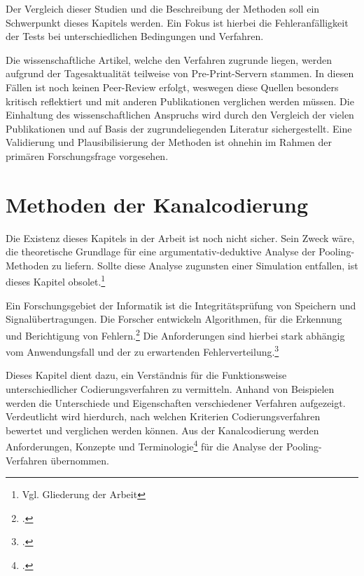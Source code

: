 Der Vergleich dieser Studien und die Beschreibung der Methoden soll ein Schwerpunkt dieses Kapitels werden.
Ein Fokus ist hierbei die Fehleranfälligkeit der Tests bei unterschiedlichen Bedingungen und Verfahren.

Die wissenschaftliche Artikel, welche den Verfahren zugrunde liegen, werden aufgrund der Tagesaktualität teilweise von Pre-Print-Servern stammen.
In diesen Fällen ist noch keinen Peer-Review erfolgt, weswegen diese Quellen besonders kritisch reflektiert und mit anderen Publikationen verglichen werden müssen.
Die Einhaltung des wissenschaftlichen Anspruchs wird durch den Vergleich der vielen Publikationen und auf Basis der zugrundeliegenden Literatur sichergestellt.
Eine Validierung und Plausibilisierung der Methoden ist ohnehin im Rahmen der primären Forschungsfrage vorgesehen.

\section{Methoden der Kanalcodierung}
Die Existenz dieses Kapitels in der Arbeit ist noch nicht sicher.
Sein Zweck wäre, die theoretische Grundlage für eine argumentativ-deduktive Analyse der Pooling-Methoden zu liefern.
Sollte diese Analyse zugunsten einer Simulation entfallen, ist dieses Kapitel obsolet.\footnote{Vgl. Gliederung der Arbeit}

Ein Forschungsgebiet der Informatik ist die Integritätsprüfung von Speichern und Signalübertragungen.
Die Forscher entwickeln Algorithmen, für die Erkennung und Berichtigung von Fehlern.\footcite{hamming_information_1987}
Die Anforderungen sind hierbei stark abhängig vom Anwendungsfall und der zu erwartenden Fehlerverteilung.\footcite{blahut_algebraic_1992}

Dieses Kapitel dient dazu, ein Verständnis für die Funktionsweise unterschiedlicher Codierungsverfahren zu vermitteln.
Anhand von Beispielen werden die Unterschiede und Eigenschaften verschiedener Verfahren aufgezeigt.
Verdeutlicht wird hierdurch, nach welchen Kriterien Codierungsverfahren bewertet und verglichen werden können.
Aus der Kanalcodierung werden Anforderungen, Konzepte und Terminologie\footcite{dankmeier_codierung_1994}
für die Analyse der Pooling-Verfahren übernommen.
